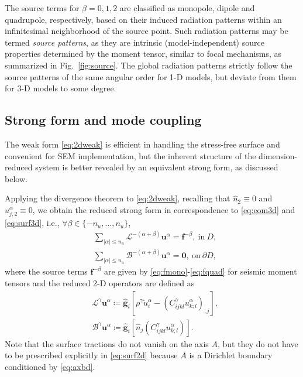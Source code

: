 \documentclass[extra,referee]{gji}
\begin{document}
The source terms for $\beta=0,1,2$ are classified as monopole, 
dipole and quadrupole, respectively, based on 
their induced radiation patterns within an infinitesimal neighborhood 
of the source point. Such radiation patterns may be termed 
\textit{source patterns}, as they are intrinsic (model-independent) 
source properties determined by the moment tensor, 
similar to focal mechanisms, as summarized in Fig.~\ref{fig:source}. 
The global radiation patterns strictly follow 
the source patterns of the same angular order \cite[]{nissen2007axisem}
for 1-D models, but deviate from them for 3-D models to some degree.


\subsection{Strong form and mode coupling}
\label{sec:strong}
The weak form \eqref{eq:2dweak} is efficient in handling the stress-free 
surface and convenient for SEM implementation, but the inherent structure 
of the dimension-reduced system is better revealed by an equivalent
strong form, as discussed below.

Applying the divergence theorem to \eqref{eq:2dweak}, recalling that 
$\hat{n}_{2}\equiv0$ and $u_{j,2}^\alpha \equiv 0$, we obtain the 
reduced strong form in correspondence to 
\eqref{eq:eom3d} and \eqref{eq:surf3d}, i.e.,
$\forall \beta\in \{-n_u,\dots,n_u\}$,
\begin{align}
  & \sum_{|\alpha|\le n_u}
  \mathscr{L}^{-\left(\alpha+\beta\right)}\mathbf{u}^\alpha=\mathbf{f}^{-\beta},
  \ \text{in}\ D,
  \label{eq:eom2d}\\[.5em]
  & \sum_{|\alpha|\le n_u}
  \mathscr{B}^{-\left(\alpha+\beta\right)}\mathbf{u}^\alpha=\mathbf{0},
  \ \text{on}\ \partial D,
  \label{eq:surf2d}
\end{align}
where the source terms $\mathbf{f}^{-\beta}$ are given by 
\eqref{eq:fmono}-\eqref{eq:fquad} for seismic moment tensors
and the reduced 2-D operators are defined as
\begin{align}
  & \mathscr{L}^{\gamma}\mathbf{u}^\alpha \coloneqq 
  \hat{\mathbf{g}}_i \left[
  \rho^\gamma \ddot{u}_i^\alpha-
  \left(C^\gamma_{ijkl} u_{k;l}^\alpha\right) _{;j}
  \right],
  \\[.5em]
  & \mathscr{B}^{\gamma}\mathbf{u}^\alpha \coloneqq 
  \hat{\mathbf{g}}_i \left[
  \hat{n}_j\left(C^\gamma_{ijkl} u_{k;l}^\alpha\right)
  \right].
\end{align}
Note that the surface tractions do not vanish on the axis $A$, but they do not  
have to be prescribed explicitly in \eqref{eq:surf2d} because $A$ is a Dirichlet 
boundary conditioned by \eqref{eq:axbd}.
\end{document}
